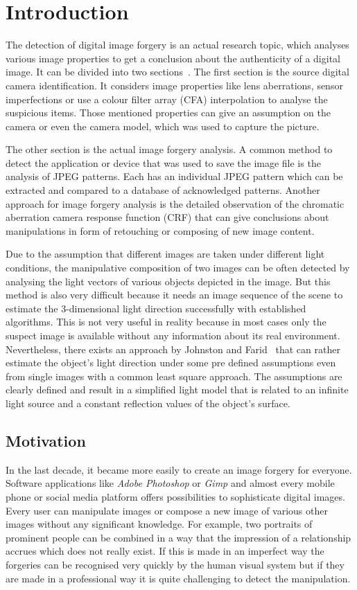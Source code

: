 \section{Introduction}\label{sec:Introduction}
The detection of digital image forgery is an actual research topic, which analyses various image properties to get a conclusion about the authenticity of a digital image. It can be divided into two sections~\cite{4284575}. The first section is the source digital camera identification. It considers image properties like lens aberrations, sensor imperfections or use a colour filter array (CFA) interpolation to analyse the suspicious items. Those mentioned properties can give an assumption on the camera or even the camera model, which was used to capture the picture.

The other section is the actual image forgery analysis. A common method to detect the application or device that was used to save the image file is the analysis of JPEG patterns. Each has an individual JPEG pattern which can be extracted and compared to a database of acknowledged patterns. Another approach for image forgery analysis is the detailed observation of the chromatic aberration camera response function (CRF) that can give conclusions about manipulations in form of retouching or composing of new image content. 

Due to the assumption that different images are taken under different light conditions, the manipulative composition of two images can be often detected by analysing the light vectors of various objects depicted in the image. But this method is also very difficult because it needs an image sequence of the scene to estimate the 3-dimensional light direction successfully with established algorithms. This is not very useful in reality because in most cases only the suspect image is available without any information about its real environment. Nevertheless, there exists an approach by Johnston and Farid~\cite{Johnson} that can rather estimate the object's light direction under some pre defined assumptions even from single images with a common least square approach. The assumptions are clearly defined and result in a simplified light model that is related to an infinite light source and a constant reflection values of the object's surface.

\subsection{Motivation}\label{sec:Motivation}
In the last decade, it became more easily to create an image forgery for everyone. Software applications like \textit{Adobe Photoshop} or \textit{Gimp} and almost every mobile phone or social media platform offers possibilities to sophisticate digital images. Every user can manipulate images or compose a new image of various other images without any significant knowledge. For example, two portraits of prominent people can be combined in a way that the impression of a relationship accrues which does not really exist. If this is made in an imperfect way the forgeries can be recognised very quickly by the human visual system but if they are made in a professional way it is quite challenging to detect the manipulation. 

